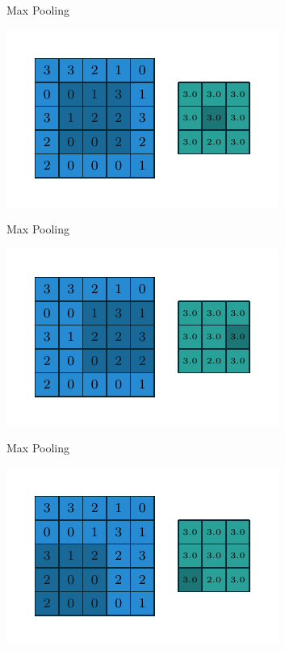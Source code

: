 \documentclass[10pt]{beamer}
\begin{document}
\begin{frame}{Max Pooling}
\begin{center}
\includegraphics[scale=1.5]{images/numerical_max_pooling_04.pdf}
\end{center}
\end{frame}

\begin{frame}{Max Pooling}
\begin{center}
\includegraphics[scale=1.5]{images/numerical_max_pooling_05.pdf}
\end{center}
\end{frame}

\begin{frame}{Max Pooling}
\begin{center}
\includegraphics[scale=1.5]{images/numerical_max_pooling_06.pdf}
\end{center}
\end{frame}
\end{document}
